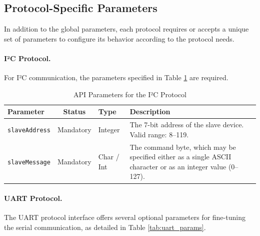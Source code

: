\subsection{Protocol-Specific Parameters}
\label{subsec:protocol_params}

In addition to the global parameters, each protocol requires or accepts a unique set of parameters to configure its behavior according to the protocol needs.

\paragraph{I²C Protocol.} For I²C communication, the parameters specified in Table \ref{tab:i2c_params} are required.

\begin{table}[h!]
    \centering
    \caption{API Parameters for the I²C Protocol}
    \label{tab:i2c_params}
    \begin{tabular}{|l|c|l|p{6cm}|}
        \hline
        \textbf{Parameter} & \textbf{Status} & \textbf{Type} & \textbf{Description} \\ \hline
        \texttt{slaveAddress} & Mandatory & Integer & The 7-bit address of the slave device. Valid range: 8–119. \\ \hline
        \texttt{slaveMessage} & Mandatory & Char / Int & The command byte, which may be specified either as a single ASCII character or as an integer value (0–127). \\ \hline
    \end{tabular}
\end{table}

\paragraph{UART Protocol.} The UART protocol interface offers several optional parameters for fine-tuning the serial communication, as detailed in Table \ref{tab:uart_params}.

